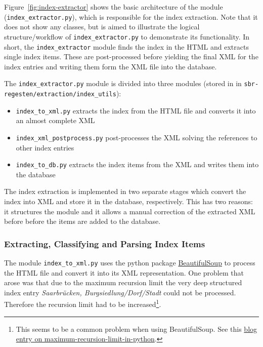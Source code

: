 Figure~\ref{fig:index-extractor} shows the basic architecture of the module (\texttt{index\_extractor.py}), which is responsible for the index extraction. Note that it does not show any classes, but is aimed to illustrate the logical structure/workflow of \texttt{index\_extractor.py} to demonstrate its functionality. In short, the \texttt{index\_extractor} module finds the index in the HTML and extracts single index items. These are post-processed before yielding the final XML for the index entries and writing them form the XML file into the database.

The \texttt{index\_extractor.py} module is divided into three modules (stored in in \texttt{sbr-regesten/\-extraction/\-index\_utils}):

\begin{itemize}
\item \texttt{index\_to\_xml.py} extracts the index from the HTML file and converts it into an almost complete XML
\item \texttt{index\_xml\_postprocess.py} post-processes the XML solving the references to other index entries
\item \texttt{index\_to\_db.py} extracts the index items from the XML and writes them into the database
\end{itemize}

The index extraction is implemented in two separate stages which convert the index into XML and store it in the database, respectively. This has two reasons: it structures the module and it allows a manual correction of the extracted XML before before the items are added to the database.

\subsubsection{Extracting, Classifying and Parsing Index Items}
The module \texttt{index\_to\_xml.py} uses the python package \href{http://www.crummy.com/software/BeautifulSoup/bs4/doc/} {BeautifulSoup} to process the HTML file and convert it into its XML representation. One problem that arose was that due to the maximum recursion limit the very deep structured index entry \textit{Saarbrücken, Burgsiedlung/Dorf/Stadt} could not be processed. Therefore the recursion limit had to be increased\footnote{This seems to be a common problem when using BeautifulSoup. See this  \href{http://blog.pablohoffman.com/maximum-recursion-limit-in-python}{blog entry on maximum-recursion-limit-in-python}.}.


